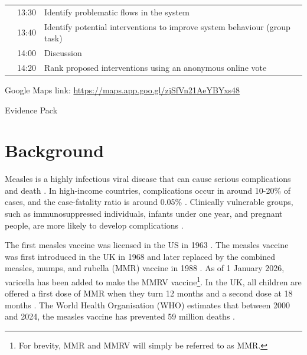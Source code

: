 \documentclass{article}
\begin{document}
\begin{titlepage}
\begin{table}[h]
\begin{tabular}{lll}
\addlinespace
\midrule

\multirow{4}{*}{Interventions}
& 13:30 & Identify problematic flows in the system \\
& 13:40 & Identify potential interventions to improve system behaviour (group task) \\
& 14:00 & Discussion \\
& 14:20 & Rank proposed interventions using an anonymous online vote \\

\bottomrule
\end{tabular}
\end{table}

\vspace{40px}

\noindent
Google Maps link: \href{https://maps.app.goo.gl/zjSfVn21AeYBYxs48}{https://maps.app.goo.gl/zjSfVn21AeYBYxs48}

\end{titlepage}

\begin{center}
    \begin{LARGE}
        Evidence Pack
    \end{LARGE}
\end{center}

\section{Background}
\label{sec:intro}
Measles is a highly infectious viral disease that can cause serious complications and death \cite{WHO_measles_topic}.
In high-income countries, complications occur in around 10-20\% of cases, and the case-fatality ratio is around 0.05\% \cite{wolfson2009estimates, NICE2024MeaslesComplications}. Clinically vulnerable groups, such as immunosuppressed individuals, infants under one year, and pregnant people, are more likely to develop complications \cite{NHSEngland2024MeaslesGuidance}.

The first measles vaccine was licensed in the US in 1963 \cite{MOSS20172490}. The measles vaccine was first introduced in the UK in 1968 and later replaced by the combined measles, mumps, and rubella (MMR) vaccine in 1988 \cite{ukhsa_vaccination_timeline_1796_present}. As of 1 January 2026, varicella has been added to make the MMRV vaccine\footnote{For brevity, MMR and MMRV will simply be referred to as MMR.}. In the UK, all children are offered a first dose of MMR when they turn 12 months and a second dose at 18 months \cite{UKHSA2023MeaslesRubellaElimination}. The World Health Organisation (WHO) estimates that between 2000 and 2024, the measles vaccine has prevented  59 million deaths \cite{mondiale2025weekly}.
\end{document}

